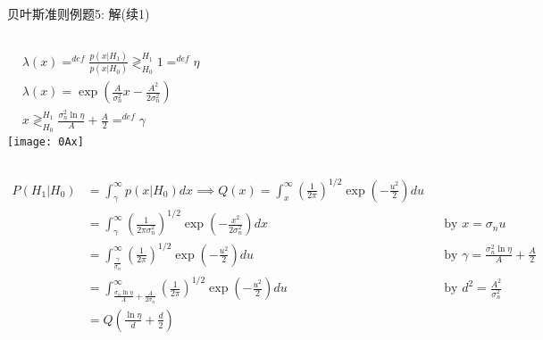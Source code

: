 \begin{frame}[shrink]{贝叶斯准则例题5: 解(续1)}
\begin{columns}
	\begin{align*}
	&\lambda(x)\mathop{=}^{def}\frac{p(x|H_1)}{p(x|H_0)}\mathop{\gtrless}_{H_0}^{H_1}1\mathop{=}^{def}\eta\\
	&\lambda(x)=\exp\left(\frac{A}{\sigma_n^2}x-\frac{A^2}{2\sigma_n^2}\right)\\
	&x\mathop{\gtrless}_{H_0}^{H_1}\frac{\sigma_n^2\ln\eta}{A}+\frac{A}{2}\mathop{=}^{def}\gamma
	\end{align*} 
	\texttt{[image: 0Ax]}
\end{columns}
\begin{align*}
P(H_1|H_0)&=\int_{\gamma}^{\infty}p(x|H_0)dx\implies Q(x)=\int_{x}^{\infty}\left(\frac{1}{2\pi}\right)^{1/2}\exp\left(-\frac{u^2}{2}\right)du\\
&=\int_{\gamma}^{\infty}\left(\frac{1}{2\pi\sigma_n^2}\right)^{1/2}\exp\left(-\frac{x^2}{2\sigma_n^2}\right)dx\qquad 
&&\text{by } x=\sigma_nu\\
&=\int_{\frac{\gamma}{\sigma_n}}^{\infty}\left(\frac{1}{2\pi}\right)^{1/2}\exp\left(-\frac{u^2}{2}\right)du\qquad &&\text{by } \gamma=\frac{\sigma_n^2\ln\eta}{A}+\frac{A}{2}\\
&=\int_{\frac{\sigma_n\ln\eta}{A}+\frac{A}{2\sigma_n}}^{\infty}\left(\frac{1}{2\pi}\right)^{1/2}\exp\left(-\frac{u^2}{2}\right)du\qquad &&\text{by } d^2=\frac{A^2}{\sigma_n^2}\\
&=Q\left(\frac{\ln\eta}{d}+\frac{d}{2}\right)
\end{align*}
\end{frame}

